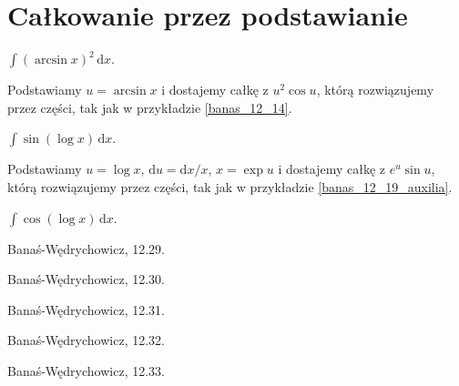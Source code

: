 \section{Całkowanie przez podstawianie}

\begin{integral}
    $\int (\arcsin x)^2 \,\mathrm{d}x$.
\end{integral}

\begin{solution}
    Podstawiamy $u = \arcsin x$ i dostajemy całkę z $u^2 \cos u$, którą rozwiązujemy przez części, tak jak w przykładzie \ref{banas_12_14}.
\end{solution}

\begin{integral}
    $\int \sin(\log x) \, \mathrm{d}x$.
\end{integral}

\begin{solution}
    Podstawiamy $u = \log x$, $\mathrm{d} u = \mathrm{d} x / x$, $x = \exp u$ i dostajemy całkę z $e^u \sin u$, którą rozwiązujemy przez części, tak jak w przykładzie \ref{banas_12_19_auxilia}.
\end{solution}

\begin{integral}
    $\int \cos(\log x) \, \mathrm{d}x$.
\end{integral}    

\begin{integral}
    Banaś-Wędrychowicz, 12.29.
\end{integral}

\begin{integral}
    Banaś-Wędrychowicz, 12.30.
\end{integral}

\begin{integral}
    Banaś-Wędrychowicz, 12.31.
\end{integral}

\begin{integral}
    Banaś-Wędrychowicz, 12.32.
\end{integral}

\begin{integral}
    Banaś-Wędrychowicz, 12.33.
\end{integral}


